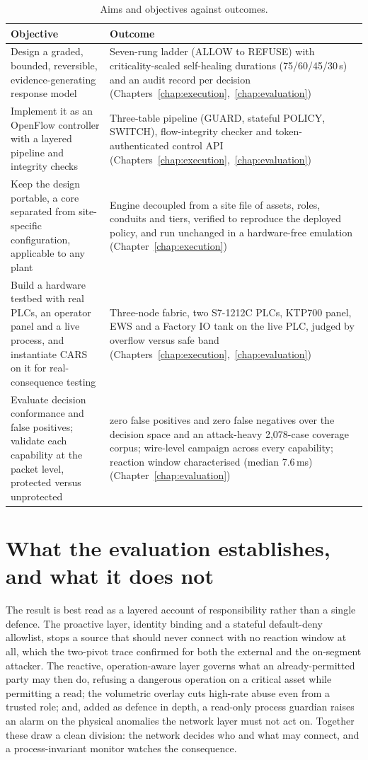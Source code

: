 \begin{table}[t]
\centering
\small
\begin{tabular}{p{}p{}}
\hline
Objective & Outcome \\
\hline
Design a graded, bounded, reversible, evidence-generating response model & Seven-rung ladder (ALLOW to REFUSE) with criticality-scaled self-healing durations (75/60/45/30\,s) and an audit record per decision (Chapters~\ref{chap:execution},~\ref{chap:evaluation}) \\
Implement it as an OpenFlow controller with a layered pipeline and integrity checks & Three-table pipeline (GUARD, stateful POLICY, SWITCH), flow-integrity checker and token-authenticated control API (Chapters~\ref{chap:execution},~\ref{chap:evaluation}) \\
Keep the design portable, a core separated from site-specific configuration, applicable to any plant & Engine decoupled from a site file of assets, roles, conduits and tiers, verified to reproduce the deployed policy, and run unchanged in a hardware-free emulation (Chapter~\ref{chap:execution}) \\
Build a hardware testbed with real PLCs, an operator panel and a live process, and instantiate CARS on it for real-consequence testing & Three-node fabric, two S7-1212C PLCs, KTP700 panel, EWS and a Factory IO tank on the live PLC, judged by overflow versus safe band (Chapters~\ref{chap:execution},~\ref{chap:evaluation}) \\
Evaluate decision conformance and false positives; validate each capability at the packet level, protected versus unprotected & zero false positives and zero false negatives over the decision space and an attack-heavy 2{,}078-case coverage corpus; wire-level campaign across every capability; reaction window characterised (median 7.6\,ms) (Chapter~\ref{chap:evaluation}) \\
\hline
\end{tabular}
\caption{Aims and objectives against outcomes.}
\label{tab:aims}
\end{table}

\section{What the evaluation establishes, and what it does not}
\label{sec:standing}

The result is best read as a layered account of responsibility rather than a single defence. The proactive layer, identity binding and a stateful default-deny allowlist, stops a source that should never connect with no reaction window at all, which the two-pivot trace confirmed for both the external and the on-segment attacker. The reactive, operation-aware layer governs what an already-permitted party may then do, refusing a dangerous operation on a critical asset while permitting a read; the volumetric overlay cuts high-rate abuse even from a trusted role; and, added as defence in depth, a read-only process guardian raises an alarm on the physical anomalies the network layer must not act on. Together these draw a clean division: the network decides who and what may connect, and a process-invariant monitor watches the consequence.

